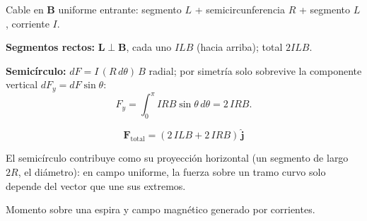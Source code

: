 \documentclass[12pt,a4paper]{article}
\begin{document}
Cable en $\mathbf{B}$ uniforme entrante: segmento $L$ +
semicircunferencia $R$ + segmento $L$, corriente $I$.

\textbf{Segmentos rectos:} $\mathbf{L}\perp\mathbf{B}$, cada uno $ILB$
(hacia arriba); total $2ILB$.

\textbf{Semicírculo:} $dF = I\,(R\,d\theta)\,B$ radial; por simetría solo
sobrevive la componente vertical $dF_y = dF\sin\theta$:
\[
F_y = \int_0^{\pi} I R B \sin\theta\, d\theta = 2\,I R B.
\]

\begin{keybox}
  \[
  \boxed{\mathbf{F}_{\text{total}} = (2\,ILB + 2\,IRB)\,\hat{\mathbf{j}}}
  \]
\end{keybox}

\begin{notebox}[Interpretación]
  El semicírculo contribuye como su proyección horizontal (un segmento de
  largo $2R$, el diámetro): en campo uniforme, la fuerza sobre un tramo
  curvo solo depende del vector que une sus extremos.
\end{notebox}

\begin{notebox}
  Momento sobre una espira y campo magnético generado por corrientes.
\end{notebox}


\end{document}
